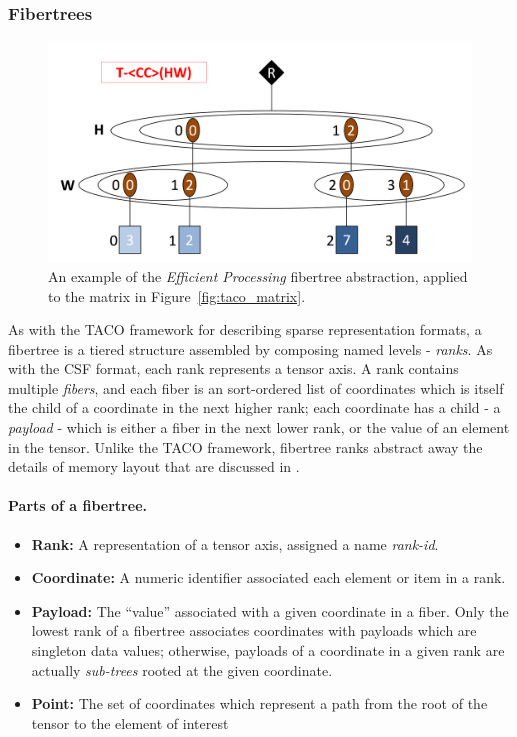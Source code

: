 \subsubsection{Fibertrees}

\begin{figure}[H]
\includegraphics[width=\textwidth]{figures/efficient_processing_fibertree.png}
\caption{An example of the \textit{Efficient Processing} fibertree abstraction, applied to the matrix in Figure~\ref{fig:taco_matrix}.}
\label{fig:efficient_processing_fibertree}
\end{figure}

As with the TACO framework for describing sparse representation formats, a fibertree is a tiered structure assembled by composing named levels - \textit{ranks}. As with the CSF format\cite{csf}, each rank represents a tensor axis. A rank contains multiple \textit{fibers}, and each fiber is an sort-ordered list of coordinates which is itself the child of a coordinate in the next higher rank; each coordinate has a child - a \textit{payload} - which is either a fiber in the next lower rank, or the value of an element in the tensor. Unlike the TACO framework, fibertree ranks abstract away the details of memory layout that are discussed in \cite{taco_format}.

\paragraph{Parts of a fibertree.}

\begin{itemize}
    \item \textbf{Rank:} A representation of a tensor axis, assigned a name \textit{rank-id}.
    \item \textbf{Coordinate:} A numeric identifier associated each element or item in a rank.
    \item \textbf{Payload:} The ``value'' associated with a given coordinate in a fiber. Only the lowest rank of a fibertree associates coordinates with payloads which are singleton data values; otherwise, payloads of a coordinate in a given rank are actually \textit{sub-trees} rooted at the given coordinate.
    \item \textbf{Point:} The set of coordinates which represent a path from the root of the tensor to the element of interest
\end{itemize}

